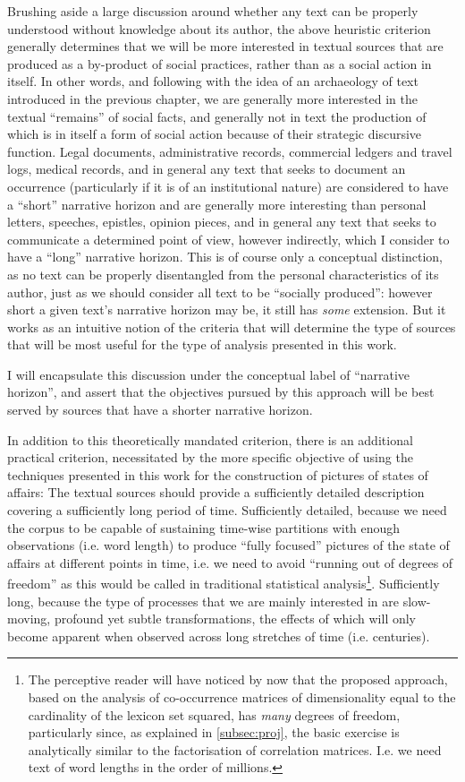 Brushing aside a large discussion around whether any text can be properly understood without knowledge about its author, the above heuristic criterion generally determines that we will be more interested in textual sources that are produced as a by-product of social practices, rather than as a social action in itself.
In other words, and following with the idea of an archaeology of text introduced in the previous chapter, we are generally more interested in the textual ``remains'' of social facts, and generally not in text the production of which is in itself a form of social action because of their strategic discursive function.
Legal documents, administrative records, commercial ledgers and travel logs, medical records, and in general any text that seeks to document an occurrence (particularly if it is of an institutional nature) are considered to have a ``short'' narrative horizon and are generally more interesting than personal letters, speeches, epistles, opinion pieces, and in general any text that seeks to communicate a determined point of view, however indirectly, which I consider to have a ``long'' narrative horizon.
This is of course only a conceptual distinction, as no text can be properly disentangled from the personal characteristics of its author, just as we should consider all text to be ``socially produced'': however short a given text's narrative horizon may be, it still has \emph{some} extension.
But it works as an intuitive notion of the criteria that will determine the type of sources that will be most useful for the type of analysis presented in this work.

I will encapsulate this discussion under the conceptual label of ``narrative horizon'', and assert that the objectives pursued by this approach will be best served by sources that have a shorter narrative horizon.

In addition to this theoretically mandated criterion, there is an additional practical criterion, necessitated by the more specific objective of using the techniques presented in this work for the construction of pictures of states of affairs:
The textual sources should provide a sufficiently detailed description covering a sufficiently long period of time.
Sufficiently detailed, because we need the corpus to be capable of sustaining time-wise partitions with enough observations (i.e. word length) to produce ``fully focused'' pictures of the state of affairs at different points in time, i.e. we need to avoid ``running out of degrees of freedom'' as this would be called in traditional statistical analysis\footnote{
    \label{foot:freedom}
    The perceptive reader will have noticed by now that the proposed approach, based on the analysis of co-occurrence matrices of dimensionality equal to the cardinality of the lexicon set squared, has \emph{many} degrees of freedom, particularly since, as explained in \autoref{subsec:proj}, the basic exercise is analytically similar to the factorisation of correlation matrices.
    I.e. we need text of word lengths in the order of millions.
}.
Sufficiently long, because the type of processes that we are mainly interested in are slow-moving, profound yet subtle transformations, the effects of which will only become apparent when observed across long stretches of time (i.e. centuries).

